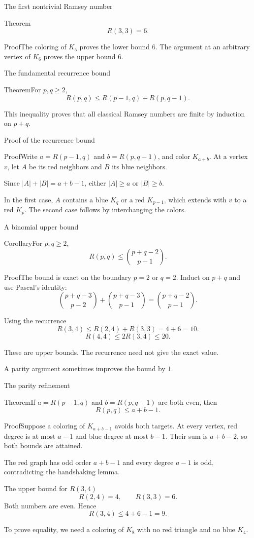 \documentclass[aspectratio=169,11pt]{beamer}
\newcommand{\Thm}[2]{\begin{block}{#1}#2\end{block}}
\renewcommand{\Proof}[1]{\begin{block}{Proof}\normalsize #1\end{block}}
\newcommand{\gap}{\par\medskip}
\begin{document}
\begin{frame}{The first nontrivial Ramsey number}
\large
\Thm{Theorem}{\[R(3,3)=6.\]}
\Proof{The coloring of $K_5$ proves the lower bound $6$. The argument at an arbitrary vertex of $K_6$ proves the upper bound $6$.}
\end{frame}
\begin{frame}{The fundamental recurrence bound}
\large
\Thm{Theorem}{For $p,q\geq2$,
\[R(p,q)\leq R(p-1,q)+R(p,q-1).\]}
\gap This inequality proves that all classical Ramsey numbers are finite by induction on $p+q$.
\end{frame}
\begin{frame}{Proof of the recurrence bound}
\large
\Proof{Write $a=R(p-1,q)$ and $b=R(p,q-1)$, and color $K_{a+b}$. At a vertex $v$, let $A$ be its red neighbors and $B$ its blue neighbors.\gap Since $|A|+|B|=a+b-1$, either $|A|\geq a$ or $|B|\geq b$.\gap In the first case, $A$ contains a blue $K_q$ or a red $K_{p-1}$, which extends with $v$ to a red $K_p$. The second case follows by interchanging the colors.}
\end{frame}
\begin{frame}{A binomial upper bound}
\large
\Thm{Corollary}{For $p,q\geq2$,
\[R(p,q)\leq\binom{p+q-2}{p-1}.\]}
\Proof{The bound is exact on the boundary $p=2$ or $q=2$. Induct on $p+q$ and use Pascal's identity:
\[\binom{p+q-3}{p-2}+\binom{p+q-3}{p-1}=\binom{p+q-2}{p-1}.\]}
\end{frame}
\begin{frame}{Using the recurrence}
\large
\[R(3,4)\leq R(2,4)+R(3,3)=4+6=10.\]
\[R(4,4)\leq 2R(3,4)\leq20.\]
\gap These are upper bounds. The recurrence need not give the exact value.
\gap A parity argument sometimes improves the bound by $1$.
\end{frame}
\begin{frame}{The parity refinement}
\large
\Thm{Theorem}{If $a=R(p-1,q)$ and $b=R(p,q-1)$ are both even, then
\[R(p,q)\leq a+b-1.\]}
\Proof{Suppose a coloring of $K_{a+b-1}$ avoids both targets. At every vertex, red degree is at most $a-1$ and blue degree at most $b-1$. Their sum is $a+b-2$, so both bounds are attained.\gap The red graph has odd order $a+b-1$ and every degree $a-1$ is odd, contradicting the handshaking lemma.}
\end{frame}
\begin{frame}{The upper bound for $R(3,4)$}
\large
\[R(2,4)=4,\qquad R(3,3)=6.\]
Both numbers are even. Hence
\[R(3,4)\leq4+6-1=9.\]
\gap To prove equality, we need a coloring of $K_8$ with no red triangle and no blue $K_4$.
\end{frame}
\end{document}

